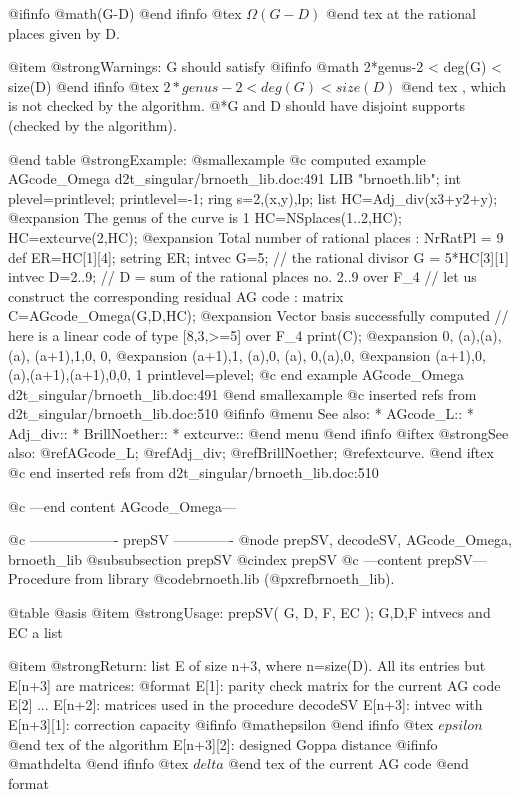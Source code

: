 @ifinfo
@math{\Omega(G-D)}
@end ifinfo
@tex
$\Omega(G-D)$
@end tex
 at the rational places given by D.

@item @strong{Warnings:}
G should satisfy 
@ifinfo
@math{ 2*genus-2 < deg(G) < size(D) }
@end ifinfo
@tex
$ 2*genus-2 < deg(G) < size(D) $
@end tex
, which is
not checked by the algorithm.
@*G and D should have disjoint supports (checked by the algorithm).

@end table
@strong{Example:}
@smallexample
@c computed example AGcode_Omega d2t_singular/brnoeth_lib.doc:491 
LIB "brnoeth.lib";
int plevel=printlevel;
printlevel=-1;
ring s=2,(x,y),lp;
list HC=Adj_div(x3+y2+y);
@expansion{} The genus of the curve is 1
HC=NSplaces(1..2,HC);
HC=extcurve(2,HC);
@expansion{} Total number of rational places : NrRatPl = 9
def ER=HC[1][4];
setring ER;
intvec G=5;      // the rational divisor G = 5*HC[3][1]
intvec D=2..9;   // D = sum of the rational places no. 2..9 over F_4
// let us construct the corresponding residual AG code :
matrix C=AGcode_Omega(G,D,HC);
@expansion{} Vector basis successfully computed 
// here is a linear code of type [8,3,>=5] over F_4
print(C);
@expansion{} 0,    (a),(a),(a),  (a+1),1,0,  0,
@expansion{} (a+1),1,  (a),0,    (a),  0,(a),0,
@expansion{} (a+1),0,  (a),(a+1),(a+1),0,0,  1 
printlevel=plevel;
@c end example AGcode_Omega d2t_singular/brnoeth_lib.doc:491
@end smallexample
@c inserted refs from d2t_singular/brnoeth_lib.doc:510
@ifinfo
@menu
See also:
* AGcode_L::
* Adj_div::
* BrillNoether::
* extcurve::
@end menu
@end ifinfo
@iftex
@strong{See also:}
@ref{AGcode_L};
@ref{Adj_div};
@ref{BrillNoether};
@ref{extcurve}.
@end iftex
@c end inserted refs from d2t_singular/brnoeth_lib.doc:510

@c ---end content AGcode_Omega---

@c ------------------- prepSV -------------
@node prepSV, decodeSV, AGcode_Omega, brnoeth_lib
@subsubsection prepSV
@cindex prepSV
@c ---content prepSV---
Procedure from library @code{brnoeth.lib} (@pxref{brnoeth_lib}).

@table @asis
@item @strong{Usage:}
prepSV( G, D, F, EC ); G,D,F intvecs and EC a list

@item @strong{Return:}
list E of size n+3, where n=size(D). All its entries but E[n+3]
are matrices:
   @format
   E[1]:  parity check matrix for the current AG code
   E[2] ... E[n+2]:  matrices used in the procedure decodeSV
   E[n+3]:  intvec with
       E[n+3][1]: correction capacity 
@ifinfo
@math{epsilon}
@end ifinfo
@tex
$epsilon$
@end tex
 of the algorithm
       E[n+3][2]: designed Goppa distance 
@ifinfo
@math{delta}
@end ifinfo
@tex
$delta$
@end tex
 of the current AG code
   @end format

